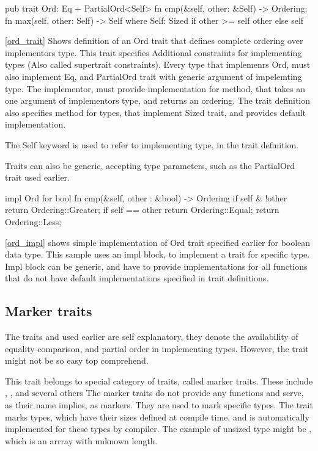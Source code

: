 \begin{code}[language=rust,label={ord_trait},caption={Trait definition}]
    pub trait Ord: Eq + PartialOrd<Self> {
    fn cmp(&self, other: &Self) -> Ordering;
    fn max(self, other: Self) -> Self where Self: Sized {
    if other >= self { other } else { self }
    }
    }
\end{code}

\autoref{ord_trait} Shows definition of an Ord trait that defines complete ordering over implementors type. This trait specifies Additional constraints for implementing types
(Also called supertrait constraints). Every type that implemenrs Ord, must also implement Eq, and PartialOrd trait with generic
argument of impelemting type. The implementor, must provide implementation for  method, that takes an one argument of implementors type,
and returns an ordering. The trait definition also specifies  method for types, that implement Sized trait, and provides default
implementation.

The Self keyword is used to refer to implementing type, in the trait definition.

Traits can also be generic, accepting type parameters, such as the PartialOrd trait used earlier.

\begin{code}[language=rust,label={ord_impl},caption={Trait implementation}]
    impl Ord for bool {
    fn cmp(&self, other : &bool) -> Ordering {
    if self & !other {
    return Ordering::Greater;
    }
    if self == other {
    return Ordering::Equal;
    }
    return Ordering::Less;
    }
    }
\end{code}

\autoref{ord_impl} shows simple implementation of Ord trait specified earlier for boolean data type. This sample
uses an impl block, to implement a trait for specific type. Impl block can be generic, and have to provide
implementations for all functions that do not have default implementations specified in trait definitions.

\subsection{Marker traits}
The traits  and  used earlier are self explanatory, they denote the availability of equality comparison, and partial order
in implementing types. However, the  trait might not be so easy top comprehend.

This trait belongs to special category of traits, called marker traits. These include  , ,  and several others
The marker traits do not provide any functions and serve, as their name implies, as markers. They are used to mark specific
types. The  trait marks types, which have their sizes defined at compile time, and is automatically implemented
for these types by compiler. The example of unsized type might be \type{[u8]} , which is an arrray with unknown length.

